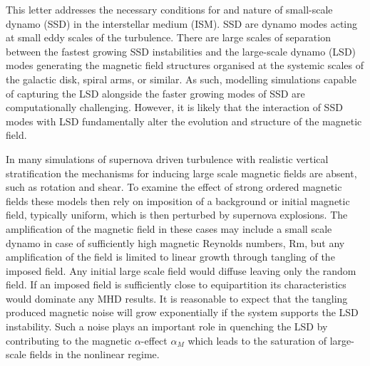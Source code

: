 \documentclass[preprint2]{aastex63}
\newcommand{\ns}[1]{\textcolor{orange}{#1}}
\begin{document}
This letter addresses the necessary conditions for and nature of small-scale
dynamo (SSD) in the interstellar medium (ISM).
SSD are dynamo modes acting at small eddy scales of the turbulence.
There are large scales of separation between the fastest growing SSD
instabilities and the large-scale dynamo (LSD) modes generating the magnetic
field structures organised at the systemic scales of the galactic disk, spiral
arms, or similar.
As such, modelling simulations capable of capturing the LSD alongside the faster
growing modes of SSD are computationally challenging.
However, it is likely that the interaction of SSD modes with LSD fundamentally
alter the evolution and structure of the magnetic field.

In many simulations of supernova driven turbulence with realistic vertical 
stratification \citep[e.g.,][]{deAvillez:2005,PO07,Hill:2012a,HI14} the
mechanisms for inducing large scale magnetic fields are absent, such as rotation
and shear.
To examine the effect of strong ordered magnetic fields these models then rely
on imposition of a background or initial magnetic field, typically uniform,
which is then perturbed by supernova explosions.
The amplification of the magnetic field in these cases may include a small scale
dynamo in case of sufficiently high magnetic Reynolds numbers, Rm, but any
amplification of the field is limited to linear growth through
tangling of the imposed field.
Any initial large scale field would diffuse leaving only the random field. 
If an imposed field is sufficiently close to equipartition its characteristics
would dominate any MHD results.
It is reasonable to expect that the tangling produced magnetic noise
will grow exponentially if the system supports the LSD instability.
Such a noise plays an important role in quenching the LSD by contributing
to the magnetic $\alpha$-effect $\alpha_M$ which leads to the saturation
of large-scale fields in the nonlinear regime.
\end{document}
